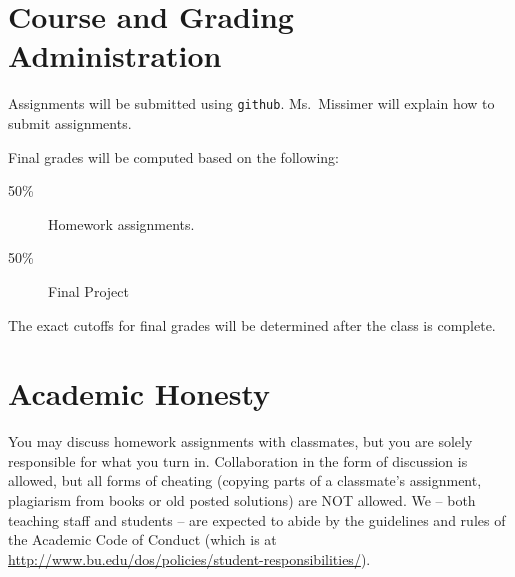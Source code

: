 \documentclass[11pt]{article}
\begin{document}
\section*{Course and Grading Administration}

Assignments will be submitted using \texttt{github}.   Ms.\ Missimer will
explain how to submit assignments.  


Final grades will be computed based on the following:
\begin{description}
\item[50\%] Homework assignments.  
\item[50\%] Final Project
\end{description}


The exact cutoffs for final grades will be determined after the class is
complete.

\newpage

\section*{Academic Honesty}

You may discuss homework assignments with classmates, but you are 
solely responsible for what you turn in. Collaboration in the form of
discussion is allowed, but all forms of cheating (copying parts of a
classmate's assignment, plagiarism from books or old posted solutions)
are NOT allowed. We -- both teaching staff and students -- are expected
to abide by the guidelines and rules of the Academic Code of Conduct
(which is at
\url{http://www.bu.edu/dos/policies/student-responsibilities/}).
\end{document}
